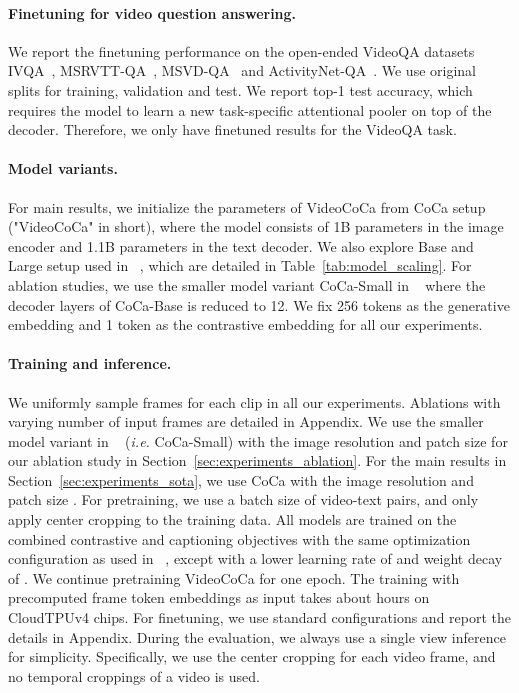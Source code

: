 \vspace{-2mm}
\paragraph{Finetuning for video question answering.}
\label{sec:experiments_setup_ft_video_qa}
We report the finetuning performance on the open-ended VideoQA datasets IVQA~\cite{yang2020just}, MSRVTT-QA~\cite{xu2017video},  MSVD-QA~\cite{xu2017video} and ActivityNet-QA~\cite{yu2019activityqa}. We use original splits for training, validation and test. We report top-1 test accuracy, which requires the model to learn a new task-specific attentional pooler on top of the decoder. Therefore, we only have finetuned results for the VideoQA task.

\vspace{-2mm}
\paragraph{Model variants.}
\label{sec:experiments_setup_model}
 For main results, we initialize the parameters of VideoCoCa from CoCa setup~\cite{yu2022coca} ("VideoCoCa" in short), where the model consists of 1B parameters in the image encoder and 1.1B parameters in the text decoder. We also explore Base and Large setup used in ~\cite{yu2022coca}, which are detailed in  Table~\ref{tab:model_scaling}. For ablation studies, we use the smaller model variant CoCa-Small in ~\cite{yu2022coca} where the decoder layers of CoCa-Base is reduced to 12. We fix 256 tokens as the generative embedding and 1 token as the contrastive embedding for all our experiments.

\paragraph{Training and inference.}
\label{sec:experiments_setup_training_inference}
We uniformly sample  frames for each clip in all our experiments. Ablations with varying number of input frames are detailed in Appendix. We use the smaller model variant in ~\cite{yu2022coca} (\emph{i.e.} CoCa-Small) with the image resolution  and patch size  for our ablation study in Section~\ref{sec:experiments_ablation}. For the main results in Section~\ref{sec:experiments_sota}, we use CoCa with the image resolution  and patch size . For pretraining, we use a batch size of  video-text pairs, and only apply center cropping to the training data. All models are trained on the combined contrastive and captioning objectives with the same optimization configuration as used in ~\cite{yu2022coca}, except with a lower learning rate of  and weight decay of . We continue pretraining VideoCoCa for one epoch. The training with precomputed frame token embeddings as input takes about  hours on  CloudTPUv4 chips. For finetuning, we use standard configurations and report the details in Appendix. During the evaluation, we always use a single view inference for simplicity. Specifically, we use the center cropping for each video frame, and no temporal croppings of a video is used.

